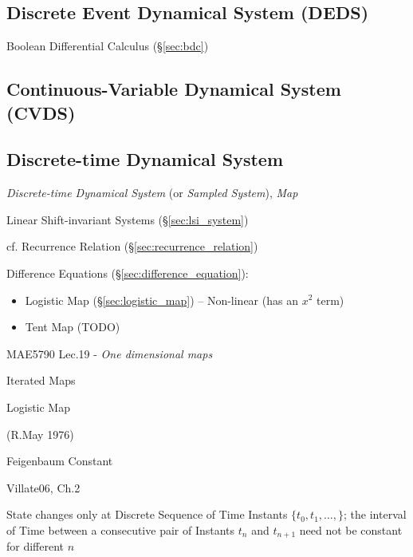 \subsection{Discrete Event Dynamical System (DEDS)}\label{sec:deds}

Boolean Differential Calculus (\S\ref{sec:bdc})



\subsection{Continuous-Variable Dynamical System (CVDS)}\label{sec:cvds}

\subsection{Discrete-time Dynamical System}\label{sec:discrete_dynamical_system}

\emph{Discrete-time Dynamical System} (or \emph{Sampled System}), \emph{Map}

\fist Linear Shift-invariant Systems (\S\ref{sec:lsi_system})

\fist cf. Recurrence Relation (\S\ref{sec:recurrence_relation})

Difference Equations (\S\ref{sec:difference_equation}):
\begin{itemize}
  \item Logistic Map (\S\ref{sec:logistic_map}) -- Non-linear (has an $x^2$
    term)
  \item Tent Map (TODO)
\end{itemize}

MAE5790 Lec.19 - \emph{One dimensional maps}

Iterated Maps

Logistic Map

(R.May 1976)

Feigenbaum Constant

Villate06, Ch.2

State changes only at Discrete Sequence of Time Instants $\{t_0, t_1, \ldots,
\}$; the interval of Time between a consecutive pair of Instants $t_n$ and
$t_{n+1}$ need not be constant for different $n$


